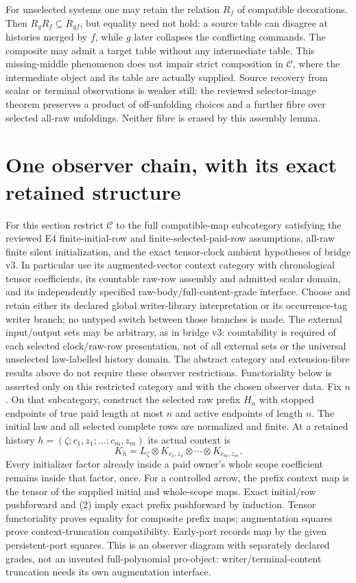 \documentclass[11pt]{article}
\begin{document}
For unselected systems one may retain the relation $R_f$ of compatible decorations. Then $R_gR_f\subseteq R_{gf}$, but equality need not hold: a source table can disagree at histories merged by $f$, while $g$ later collapses the conflicting commands. The composite may admit a target table without any intermediate table. This missing-middle phenomenon does not impair strict composition in $\mathcal C$, where the intermediate object and its table are actually supplied. Source recovery from scalar or terminal observations is weaker still: the reviewed selector-image theorem preserves a product of off-unfolding choices and a further fibre over selected all-raw unfoldings. Neither fibre is erased by this assembly lemma.

\section{One observer chain, with its exact retained structure}
For this section restrict $\mathcal C$ to the full compatible-map subcategory satisfying the reviewed E4 finite-initial-row and finite-selected-paid-row assumptions, all-raw finite silent initialization, and the exact tensor-clock ambient hypotheses of bridge v3. In particular use its augmented-vector context category with chronological tensor coefficients, its countable raw-row assembly and admitted scalar domain, and its independently specified raw-body/full-content-grade interface. Choose and retain either its declared global writer-library interpretation or its occurrence-tag writer branch; no untyped switch between those branches is made. The external input/output sets may be arbitrary, as in bridge v3: countability is required of each selected clock/raw-row presentation, not of all external sets or the universal unselected law-labelled history domain. The abstract category and extension-fibre results above do not require these observer restrictions. Functoriality below is asserted only on this restricted category and with the chosen observer data. Fix $n$. On that subcategory, construct the selected raw prefix $H_n$ with stopped endpoints of true paid length at most $n$ and active endpoints of length $n$. The initial law and all selected complete rows are normalized and finite. At a retained history
$h=(\zeta;c_1,z_1;\ldots;c_m,z_m)$ its actual context is
\[
 K_h=L_\zeta\otimes K_{c_1,z_1}\otimes\cdots\otimes K_{c_m,z_m}. \tag{4}
\]
Every initializer factor already inside a paid owner's whole scope coefficient remains inside that factor, once. For a controlled arrow, the prefix context map is the tensor of the supplied initial and whole-scope maps. Exact initial/row pushforward and (2) imply exact prefix pushforward by induction. Tensor functoriality proves equality for composite prefix maps; augmentation squares prove context-truncation compatibility. Early-port records map by the given persistent-port squares. This is an observer diagram with separately declared grades, not an invented full-polynomial pro-object: writer/terminal-content truncation needs its own augmentation interface.
\end{document}
